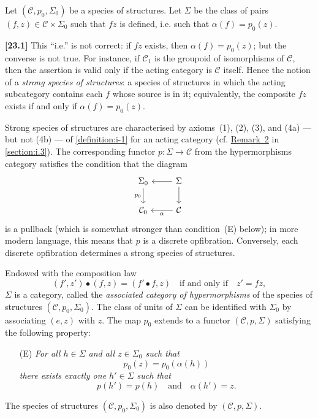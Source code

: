 \documentclass[a4paper,fleqn]{article}
\theoremstyle{plain}
\theoremstyle{definition}
\newenvironment{longcomm}[1]
  {\noindent\textbf{[#1]}\rmfamily}
  {}
\newcommand{\oldpage}[1]{{\marginpar{\footnotesize$\bigg\vert$\,\,\,\,\textit{p.~#1}}}}
\newcommand{\textand}{\quad\text{and}\quad}
\newcommand{\CC}{\mathcal{C}}
\newcommand{\smallbullet}{\bullet}
\begin{document}
Let $(\CC,p_0,\Sigma_0)$ be a species of structures.
Let $\Sigma$ be the class of pairs $(f,z)\in\CC\times\Sigma_0$ such that $fz$ is defined, i.e. such that $\alpha(f)=p_0(z)$.

\begin{longcomm}{23.1}
  This ``i.e.'' is not correct: if $fz$ exists, then $\alpha(f)=p_0(z)$;
  but the converse is not true.
  For instance, if $\CC_1$ is the groupoid of isomorphisms of $\CC$, then the assertion is valid only if the acting category is $\CC$ itself.
  Hence the notion of a \emph{strong species of structures}: a species of structures in which the acting subcategory contains each $f$ whose source is in it;
  equivalently, the composite $fz$ exists if and only if $\alpha(f)=p_0(z)$.

  Strong species of structures are characterised by axioms~(1), (2), (3), and (4a) --- but not (4b) --- of \cref{definition:i-1} for an acting category (cf. \hyperref[remark:i-2]{Remark~2} in \cref{section:i.3}).
  The corresponding functor $p\colon\Sigma\to\CC$ from the hypermorphisms category satisfies the condition that the diagram
  \[
    \begin{tikzcd}
      \Sigma_0
        \ar[d,swap,"p_0"]
      & \Sigma
        \ar[l]
        \ar[d]
    \\\CC_0
      & \CC
        \ar[l,"\alpha"]
    \end{tikzcd}
  \]
  is a pullback (which is somewhat stronger than condition~(E) below);
  in more modern language, this means that $p$ is a discrete opfibration.
  Conversely, each discrete opfibration determines a strong species of structures.
\end{longcomm}

Endowed with the composition law
\[
  (f',z')\smallbullet(f,z)
  = (f'\smallbullet f,z)
  \quad\text{if and only if}\quad
  z'=fz,
\]
\oldpage{352}
$\Sigma$ is a category, called the \emph{associated category of hypermorphisms} of the species of structures $(\CC,p_0,\Sigma_0)$.
The class of units of $\Sigma$ can be identified with $\Sigma_0$ by associating $(e,z)$ with $z$.
The map $p_0$ extends to a functor $(\CC,p,\Sigma)$ satisfying the following property:
\begin{enumerate}
  \item[\normalfont(E)] \itshape
    For all $h\in\Sigma$ and all $z\in\Sigma_0$ such that
    \[
      p_0(z)
      = p_0(\alpha(h))
    \]
    there exists exactly one $h'\in\Sigma$ such that
    \[
      p(h')=p(h)
      \textand
      \alpha(h')=z.
    \]
\end{enumerate}
The species of structures $(\CC,p_0,\Sigma_0)$ is also denoted by $(\CC,p,\Sigma)$.
\end{document}
